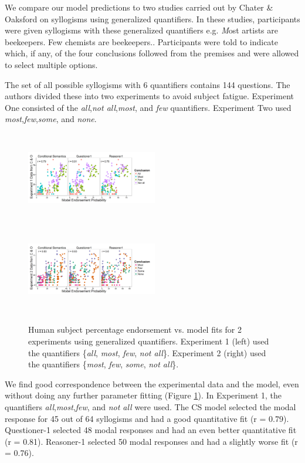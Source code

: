 \documentclass[10pt,letterpaper]{article}
\begin{document}
We compare our model predictions to two studies carried out by Chater \& Oaksford on syllogisms using generalized quantifiers. In these studies, participants were given syllogisms with these generalized quantifiers e.g. {\emph Most artists are beekeepers. Few chemists are beekeepers.}. Participants were told to indicate which, if any, of the four conclusions followed from the premises and were allowed to select multiple options.

The set of all possible syllogisms with 6 quantifiers contains 144 questions.  The authors divided these into two experiments to avoid subject fatigue. Experiment One consisted of the \emph{all},\emph{not all},\emph{most}, and \emph{few} quantifiers. Experiment Two used \emph{most},\emph{few},\emph{some}, and \emph{none}. 

\begin{figure}[htp]
  \includegraphics[width=0.51\textwidth,height=4cm]{fig3a_multiScatter_AMFO_n6_alpha2}
    \includegraphics[width=0.51\textwidth,height=4cm]{fig3b_multiScatter_MFIE_n6_alpha2}
      \caption{Human subject percentage endorsement vs. model fits for 2 experiments using generalized quantifiers. Experiment 1 (left) used the quantifiers \{\emph{all}, \emph{most}, \emph{few}, \emph{not all}\}. Experiment 2 (right) used the quantifiers \{\emph{most}, \emph{few}, \emph{some}, \emph{not all}\}.}
  \label{fig:mfScatter}
\end{figure}


We find good correspondence between the experimental data and the model, even without doing any further parameter fitting (Figure \ref{fig:mfScatter}). In Experiment 1, the quantifiers \emph{all},\emph{most},\emph{few}, and \emph{not all} were used. The CS model selected the modal response for 45 out of 64 syllogisms and had a good quantitative fit (r = 0.79). Questioner-1 selected 48 modal responses and had an even better quantitative fit (r = 0.81). Reasoner-1 selected 50 modal responses and had a slightly worse fit (r = 0.76). 
\end{document}
